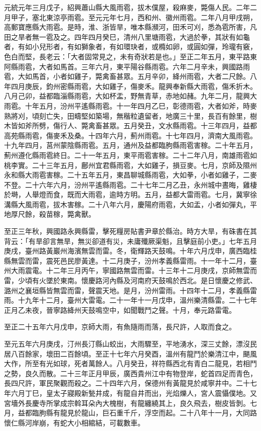 \begin{pinyinscope}
 元統元年三月戊子，紹興蕭山縣大風雨雹，拔木僕屋，殺麻麥，斃傷人民。二年二月甲子，塞北東涼亭雨雹。至元元年七月，西和州、徽州雨雹。二年八月甲戌朔，高郵寶應縣大雨雹。是時，淮、浙皆旱，唯本縣瀕河，田禾可刈，悉為雹所害，凡田之旱者無一雹及之。四年四月癸巳，清州八里塘雨雹，大過於拳，其狀有如龜者，有如小兒形者，有如獅象者，有如環玦者，或橢如卵，或圓如彈，玲瓏有竅，色白而堅，長老云：「大者固常見之，未有奇狀若是也。」至正二年五月，東平路東阿縣雨雹，大者如馬首。三年六月，東平陽谷縣雨雹。六年二月辛未，興國路雨雹，大如馬首，小者如雞子，斃禽畜甚眾。五月辛卯，絳州雨雹，大者二尺餘。八年四月庚辰，鈞州密縣雨雹，大如雞子，傷麥禾。龍興奉新縣大雨雹，傷禾折木。八月己卯，益都臨淄縣雨雹，大如杯盂，野無青草，赤地如赭。九年二月，龍興大雨雹。十年五月，汾州平遙縣雨雹。十一年四月乙巳，彰德雨雹，大者如斧，時麥熟將刈，頃刻亡失，田疇堅如築場，無稭粒遺留者，地廣三十里，長百有餘里，樹木皆如斧所劈，傷行人、斃禽畜甚眾。五月癸丑，文水縣雨雹。十三年四月，益都高苑縣雨雹，傷麥禾及桑。十四年六月，薊州雨雹。十七年四月，濟南大風雨雹。十九年四月，莒州蒙陰縣雨雹。五月，通州及益都臨朐縣雨雹害稼。二十年五月，薊州遵化縣雨雹終日。二十一年五月，東平雨雹害稼。二十二年八月，南雄雨雹如桃李實。二十三年五月，鄜州宜君縣雨雹，大如雞子，損豆麥。七月，京師及隰州永和縣大雨雹害稼。二十五年五月，東昌聊城縣雨雹，大如拳，小者如雞子，二麥不登。二十六年六月，汾州平遙縣雨雹。二十七年二月乙丑，永州城中晝晦，雞棲於塒，人舉燈而食，既而大雨雹，逾時方明。五月，益都大雷雨雹。七月，冀寧徐溝縣大風雨雹，拔木害稼。二十八年六月，慶陽府雨雹，大如盂，小者如彈丸，平地厚尺餘，殺苗稼，斃禽獸。



 至正三年秋，興國路永興縣雷，擊死糧房貼書尹章於縣治。時方大旱，有硃書在其背云：「有旱卻言無旱，無災卻道有災，未庸殲厥渠魁，且擊庭前小吏。」七年五月庚戌，臺州路黃巖州海濱無雲而雷。冬，衛輝路天鼓鳴。十年六月戊申，廣西臨桂縣無雲而雷，震死邑民廖黃達。十二月庚子，汾州孝義縣雷雨。十一年十二月，臺州大雨震電。十二年三月丙午，寧國路無雲而雷。十三年十二月庚戌，京師無雲而雷，少頃有火墜於東南。懷慶路河內縣及河南府天鼓鳴於西北。是日懷慶之修武、潞州之襄垣縣皆無雲而雷，聲震天地。是月，汾州雷雨。十四年十二月，孝義縣雷雨。十九年十二月，臺州大雷電。二十一年十一月戊申，溫州樂清縣雷。二十七年正月乙未夜，晉寧路絳州天鼓鳴空中，如聞戰鬥之聲。十月，奉元路雷電。



 至正二十五年六月戊申，京師大雨，有魚隨雨而落，長尺許，人取而食之。



 至元五年六月庚戌，汀州長汀縣山蛟出，大雨驟至，平地湧水，深三丈餘，漂沒民居八百餘家，壞田二百餘頃。至正十七年六月癸酉，溫州有龍鬥於樂清江中，颶風大作，所至有光如球，死者萬餘人。八月癸丑，祥符縣西北有青白二龍見，若相鬥之勢，良久而散。二十三年正月甲辰，廣西貴州江中有物登岸，蛇首四足而青色，長四尺許，軍民聚觀而殺之。二十四年六月，保德州有黃龍見於咸寧井中。二十七年六月丁巳，皇太子寢殿新甃井成，有龍自井而出，光焰爍人，宮人震懾僕地。又宮墻外長慶寺所掌成宗斡耳朵內大槐樹，有龍纏繞其上，良久飛去，樹皮皆剝。七月，益都臨朐縣有龍見於龍山，巨石重千斤，浮空而起。二十八年十一月，大同路懷仁縣河岸崩，有蛇大小相綰結，可載數車。




\end{pinyinscope}
